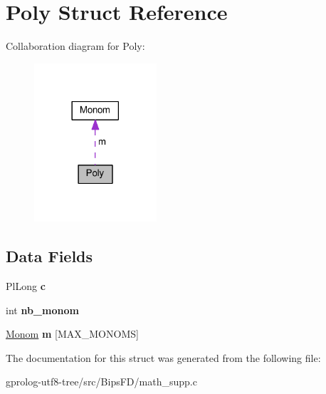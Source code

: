 \hypertarget{structPoly}{}\section{Poly Struct Reference}
\label{structPoly}


Collaboration diagram for Poly\+:\nopagebreak
\begin{figure}[H]
\begin{center}
\leavevmode
\includegraphics[width=129pt]{structPoly__coll__graph}
\end{center}
\end{figure}
\subsection*{Data Fields}
\begin{DoxyCompactItemize}
\item 
Pl\+Long {\bfseries c}\hypertarget{structPoly_ac87064f885d4389f545b4194de01f60e}{}\label{structPoly_ac87064f885d4389f545b4194de01f60e}

\item 
int {\bfseries nb\+\_\+monom}\hypertarget{structPoly_a23949f807fc70dcf7c1b7b18bb48be0c}{}\label{structPoly_a23949f807fc70dcf7c1b7b18bb48be0c}

\item 
\hyperlink{structMonom}{Monom} {\bfseries m} \mbox{[}M\+A\+X\+\_\+\+M\+O\+N\+O\+MS\mbox{]}\hypertarget{structPoly_a1bae103a920d8182006ef10891c87906}{}\label{structPoly_a1bae103a920d8182006ef10891c87906}

\end{DoxyCompactItemize}


The documentation for this struct was generated from the following file\+:\begin{DoxyCompactItemize}
\item 
gprolog-\/utf8-\/tree/src/\+Bips\+F\+D/math\+\_\+supp.\+c\end{DoxyCompactItemize}
